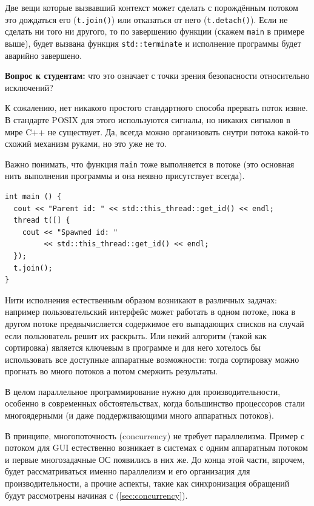 \documentclass[a4paper,12pt,oneside]{book}
\newif\ifanswers
\begin{document}
Две вещи которые вызвавший контекст может сделать с порождённым потоком это дождаться его (\lstinline!t.join()!) или отказаться от него (\lstinline!t.detach()!). Если не сделать ни того ни другого, то по завершению функции (скажем \lstinline!main! в примере выше), будет вызвана функция \lstinline!std::terminate! и исполнение программы будет аварийно завершено.

\textbf{Вопрос к студентам:} что это означает с точки зрения безопасности относительно исключений?

\ifanswers
Это означает, что поток это критический ресурс и должен быть либо завернут в какую-нибудь обёртку, либо catch-all и всё вытекающее
\fi

К сожалению, нет никакого простого стандартного способа прервать поток извне. В стандарте POSIX для этого используются сигналы, но никаких сигналов в мире C++ не существует. Да, всегда можно организовать снутри потока какой-то схожий механизм руками, но это уже не то.

Важно понимать, что функция \lstinline!main! тоже выполняется в потоке (это основная нить выполнения программы и она неявно присутствует всегда).

\begin{lstlisting}
int main () {
  cout << "Parent id: " << std::this_thread::get_id() << endl;
  thread t([] { 
    cout << "Spawned id: " 
         << std::this_thread::get_id() << endl; 
  });
  t.join();
}
\end{lstlisting}

Нити исполнения естественным образом возникают в различных задачах: например пользовательский интерфейс может работать в одном потоке, пока в другом потоке предвычисляется содержимое его выпадающих списков на случай если пользователь решит их раскрыть. Или некий алгоритм (такой как сортировка) является ключевым в программе и для него хотелось бы использовать все доступные аппаратные возможности: тогда сортировку можно прогнать во много потоков а потом смержить результаты.

В целом параллельное программирование нужно для производительности, особенно в современных обстоятельствах, когда большинство процессоров стали многоядерными (и даже поддерживающими много аппаратных потоков).

В принципе, многопоточность (concurrency) не требует параллелизма. Пример с потоком для GUI естественно возникает в системах с одним аппаратным потоком и первые многозадачные ОС появились в них же. До конца этой части, впрочем, будет рассматриваться именно параллелизм и его организация для производительности, а прочие аспекты, такие как синхронизация обращений будут рассмотрены начиная с (\ref{sec:concurrency}). 
\end{document}
